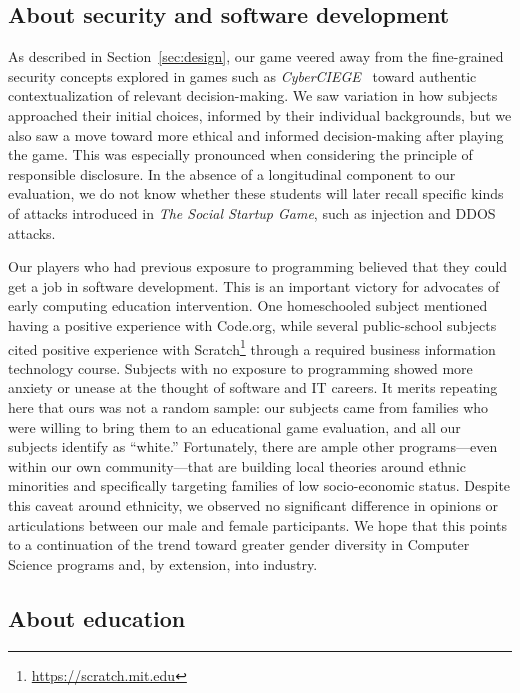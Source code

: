 \documentclass[letterpaper]{article}
\begin{document}
\subsection{About security and software development}

As described in Section~\ref{sec:design}, our game veered away
from the fine-grained security concepts explored in 
games such as \textit{CyberCIEGE}~\citep{Irvine2005} toward
authentic contextualization of relevant decision-making.
We saw variation in how subjects approached their initial choices,
informed by their individual backgrounds, but we also saw a move toward
more ethical and informed decision-making after playing the game.
This was especially pronounced when considering the principle
of responsible disclosure.
In the absence of a longitudinal component to our evaluation,
we do not know whether these students will later recall specific
kinds of attacks introduced in \textit{The Social Startup Game},
such as injection and DDOS attacks.

Our players who had previous exposure to programming believed that
they could get a job in software development. This is an important
victory for advocates of early computing education intervention.
One homeschooled subject mentioned having a positive experience with
Code.org, while several public-school subjects cited positive experience
with Scratch\footnote{\url{https://scratch.mit.edu}} through a required
business information technology course. Subjects with no exposure to
programming showed more anxiety or unease at the thought of software
and IT careers. It merits repeating here that ours was
not a random sample: our subjects came from families who were willing
to bring them to an educational game evaluation, and all our subjects
identify as ``white.'' Fortunately, there are ample other programs---even
within our own community---that are building local theories around
ethnic minorities and specifically targeting families of low socio-economic 
status.
Despite this caveat around ethnicity, we observed no significant difference
in opinions or articulations between our male and female participants.
We hope that this points to a continuation of the trend toward greater
gender diversity in Computer Science programs and, by extension, into
industry.


\subsection{About education}
\end{document}
